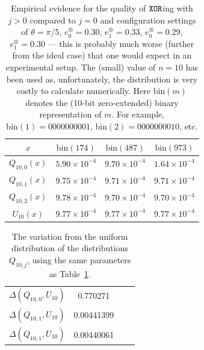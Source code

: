 \documentclass{mscs}
\begin{document}
\begin{table}
\begin{center}

	\caption{Empirical evidence for the quality of ${\tt XOR}$ing with $j>0$ compared to $j=0$ and configuration settings of $\theta=\pi/5$, $e_0^\oplus=0.30$, $e_1^\oplus=0.33$, $e_0^\otimes=0.29$, $e_1^\otimes=0.30$ --- this is probably much worse (further from the ideal case) that one would expect in an experimental setup. The (small) value of $n=10$ has been used as, unfortunately, the distribution is very costly to calculate numerically. Here $\text{bin}(m)$ denotes the (10-bit zero-extended) binary representation of $m$. For example, $\text{bin}(1)=0000000001$, $\text{bin}(2)=0000000010$, etc. }
\begin{tabular}{cccc}
\hline\hline
$x$ & $\text{bin}(174)$ & $\text{bin}(487)$ & $\text{bin}(973)$\\
\hline
$Q_{10,0}(x)$ & $5.90\times 10^{-4}$ & $9.70\times 10^{-4}$ & $1.64\times 10^{-4}$\\
$Q_{10,1}(x)$ & $9.75\times 10^{-4}$ & $9.71\times 10^{-4}$ & $9.71\times 10^{-4}$\\
$Q_{10,2}(x)$ & $9.78\times 10^{-4}$ & $9.70\times 10^{-4}$ & $9.70\times 10^{-4}$\\
$U_{10}(x)$ & $9.77\times 10^{-4}$   & $9.77\times 10^{-4}$ & $9.77\times 10^{-4}$\\
\hline\hline
\end{tabular}
	\end{center}
\label{SampleQValues}
\end{table}
\begin{table}
\begin{center}
	\caption{The variation from the uniform distribution of the distributions $Q_{10,j}$, using the same parameters as Table~\ref{SampleQValues}.}
\begin{tabular}{cccc}
\hline\hline
$\Delta(Q_{10,0},U_{10})$ & 0.770271 &&\\
$\Delta(Q_{10,1},U_{10})$ & \phantom{0.} 0.00441399 &&\\
$\Delta(Q_{10,1},U_{10})$ & \phantom{0.} 0.00440061 &&\\
\hline\hline
\end{tabular}
\end{center}

\label{QDistEx}
\end{table}
\end{document}
